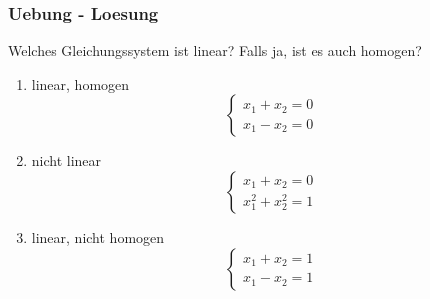 \begin{frame}
    \frametitle{Uebung - Loesung}
    Welches Gleichungssystem ist linear?
    Falls ja, ist es auch homogen?
    \begin{enumerate}
        \item linear, homogen
        \begin{equation*}
            \begin{cases}
                x_1 + x_2 = 0 \\
                x_1 - x_2 = 0
            \end{cases}
        \end{equation*}
        \item nicht linear
        \begin{equation*}
            \begin{cases}
                x_1 + x_2 = 0 \\
                x_1^2 + x_2^2 = 1
            \end{cases}
        \end{equation*}
        \item linear, nicht homogen
        \begin{equation*}
            \begin{cases}
                x_1 + x_2 = 1 \\
                x_1 - x_2 = 1
            \end{cases}
        \end{equation*}
    \end{enumerate}
\end{frame}

